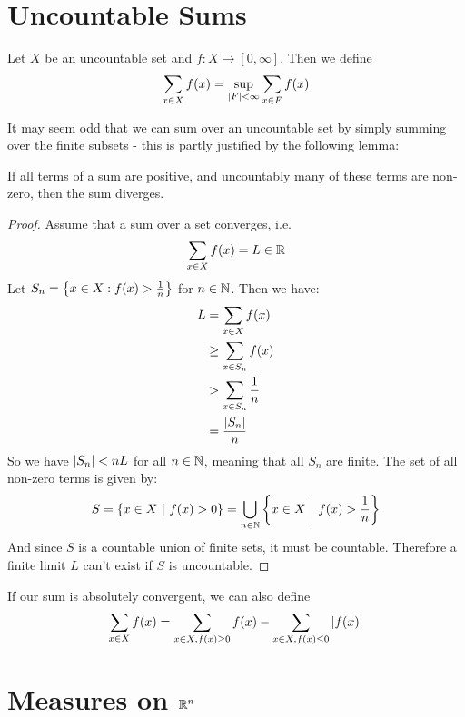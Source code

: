 \section{Uncountable Sums}
\begin{definition}
	Let $X$ be an uncountable set and $f : X \to [0,\infty]$. Then we define
	\begin{align*}
		\sum_{x \in X} f(x) = \sup_{\abs{F} < \infty} \sum_{x \in F} f(x)
	\end{align*}
\end{definition}
It may seem odd that we can sum over an uncountable set by simply summing over the finite subsets - this is partly justified by the following lemma:
\begin{lemma}
	If all terms of a sum are positive, and uncountably many of these terms are non-zero, then the sum diverges.
\end{lemma}
\begin{proof}
	Assume that a sum over a set converges, i.e. 
	\begin{align*}
		\sum_{x \in X} f(x) = L \in \mathbb{R}
	\end{align*}
	Let $S_n = \qty{x \in X : f(x) > \frac{1}{n}}$ for $n \in \mathbb{N}$. Then we have:
	\begin{align*}
		L &= \sum_{x \in X} f(x)\\
		&\geq \sum_{x \in S_n} f(x)\\
		&> \sum_{x \in S_n} \frac{1}{n}\\
		&= \frac{\abs{S_n}}{n}
	\end{align*}
	So we have $\abs{S_n} < nL$ for all $n \in \mathbb{N}$, meaning that all $S_n$ are finite. The set of all non-zero terms is given by:
	\begin{align*}
		S = \qty{x \in X ~\middle|~f(x) > 0} = \bigcup_{n \in \mathbb{N}} \qty{x \in X ~\middle|~f(x) > \frac{1}{n}}
	\end{align*}
	And since $S$ is a countable union of finite sets, it must be countable. Therefore a finite limit $L$ can't exist if $S$ is uncountable.
\end{proof}
\begin{definition}
	If our sum is absolutely convergent, we can also define
	\begin{align*}
		\sum_{x \in X} f(x) = \sum_{x \in X, f(x) \geq 0} f(x) - \sum_{x \in X, f(x) \leq 0} \abs{f(x)}
	\end{align*}
\end{definition}
\fi
\clearpage

\section{Measures on $\mathbb{R}^n$}
